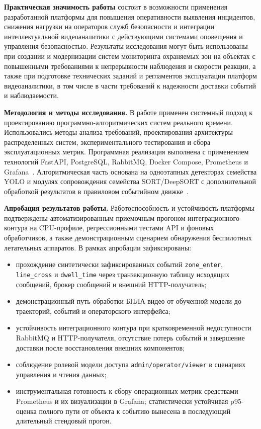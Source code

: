 \textbf{Практическая значимость работы} состоит в возможности применения разработанной платформы для повышения оперативности выявления инцидентов, снижения нагрузки на операторов служб безопасности и интеграции интеллектуальной видеоаналитики с действующими системами оповещения и управления безопасностью. Результаты исследования могут быть использованы при создании и модернизации систем мониторинга охраняемых зон на объектах с повышенными требованиями к непрерывности наблюдения и скорости реакции, а также при подготовке технических заданий и регламентов эксплуатации платформ видеоаналитики, в том числе в части требований к надежности доставки событий и наблюдаемости.

\textbf{Методология и методы исследования.} В работе применен системный подход к проектированию программно-алгоритмических систем реального времени. Использовались методы анализа требований, проектирования архитектуры распределенных систем, экспериментального тестирования и сбора эксплуатационных метрик. Программная реализация выполнена с применением технологий FastAPI, PostgreSQL, RabbitMQ, Docker Compose, Prometheus и Grafana~\cite{fastapi_docs,sqlalchemy_docs,rabbitmq_docs,docker_docs,prometheus_docs,grafana_docs}. Алгоритмическая часть основана на одноэтапных детекторах семейства YOLO и модулях сопровождения семейства SORT/DeepSORT с дополнительной обработкой результатов в правиловом событийном движке~\cite{redmon2016yolo,bewley2016sort,wojke2017deepsort}.

\textbf{Апробация результатов работы.} Работоспособность и устойчивость платформы подтверждены автоматизированным приемочным прогоном интеграционного контура на CPU-профиле, регрессионными тестами API и фоновых обработчиков, а также демонстрационным сценарием обнаружения беспилотных летательных аппаратов. В рамках апробации зафиксированы:
\begin{itemize}
    \item прохождение синтетически зафиксированных событий \texttt{zone\_enter}, \texttt{line\_cross} и \texttt{dwell\_time} через транзакционную таблицу исходящих сообщений, брокер сообщений и внешний HTTP-получатель;
    \item демонстрационный путь обработки БПЛА-видео от обученной модели до траекторий, событий и операторского интерфейса;
    \item устойчивость интеграционного контура при кратковременной недоступности RabbitMQ и HTTP-получателя, отсутствие потерь событий и завершение доставки после восстановления внешних компонентов;
    \item соблюдение ролевой модели доступа \texttt{admin/operator/viewer} в сценариях управления и чтения данных;
    \item инструментальная готовность к сбору операционных метрик средствами Prometheus и их визуализации в Grafana; статистически устойчивая p95-оценка полного пути от объекта к событию вынесена в последующий длительный стендовый прогон.
\end{itemize}

